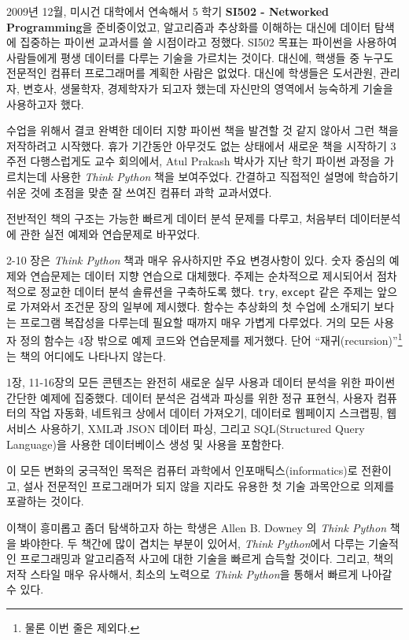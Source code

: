 2009년 12월, 미시건 대학에서 연속해서 5 학기 {\bf SI502 - Networked Programming}을 준비중이었고,
알고리즘과 추상화를 이해하는 대신에 데이터 탐색에 집중하는 파이썬 교과서를 쓸 시점이라고 정했다.
SI502 목표는 파이썬을 사용하여 사람들에게 평생 데이터를 다루는 기술을 가르치는 것이다.
대신에, 핵생들 중 누구도 전문적인 컴퓨터 프로그래머를 계획한 사람은 없었다.
대신에 학생들은 도서관원, 관리자, 변호사, 생물학자, 경제학자가 되고자 했는데 자신만의 영역에서 능숙하게 기술을 사용하고자 했다.

수업을 위해서 결코 완벽한 데이터 지향 파이썬 책을 발견할 것 같지 않아서 그런 책을 저작하려고 시작했다.
휴가 기간동안 아무것도 없는 상태에서 새로운 책을 시작하기 3주전 다행스럽게도 교수 회의에서, Atul Prakash 박사가
지난 학기 파이썬 과정을 가르치는데 사용한 \emph{Think Python} 책을 보여주었다.
간결하고 직접적인 설명에 학습하기 쉬운 것에 초점을 맞춘 잘 쓰여진 컴퓨터 과학 교과서였다.

전반적인 책의 구조는 가능한 빠르게 데이터 분석 문제를 다루고, 처음부터 데이터분석에 관한 실전 예제와 연습문제로 바꾸었다.

2-10 장은 \emph{Think Python} 책과 매우 유사하지만 주요 변경사항이 있다.
숫자 중심의 예제와 연습문제는 데이터 지향 연습으로 대체했다.
주제는 순차적으로 제시되어서 점차적으로 정교한 데이터 분석 솔류션을 구축하도록 했다.
{\tt try}, {\tt except} 같은 주제는 앞으로 가져와서 조건문 장의 일부에 제시했다.
함수는 추상화의 첫 수업에 소개되기 보다는 프로그램 복잡성을 다루는데 필요할 때까지 매우 가볍게 다루었다.
거의 모든 사용자 정의 함수는 4장 밖으로 예제 코드와 연습문제를 제거했다.
단어 ``재귀(recursion)''\footnote{물론 이번 줄은 제외다.}는 책의 어디에도 나타나지 않는다.

1장, 11-16장의 모든 콘텐츠는 완전히 새로운 실무 사용과 데이터 분석을 위한 파이썬 간단한 예제에 집중했다.
데이터 분석은 검색과 파싱를 위한 정규 표현식, 사용자 컴퓨터의 작업 자동화, 네트워크 상에서 데이터 가져오기,
데이터로 웹페이지 스크랩핑, 웹서비스 사용하기, XML과 JSON 데이터 파싱, 그리고 SQL(Structured Query Language)을 사용한
데이터베이스 생성 및 사용을 포함한다.

이 모든 변화의 궁극적인 목적은 컴퓨터 과학에서 인포매틱스(informatics)로 전환이고, 설사 전문적인 프로그래머가 되지 않을 지라도
유용한 첫 기술 과목안으로 의제를 포괄하는 것이다.

이책이 흥미롭고 좀더 탐색하고자 하는 학생은 Allen B. Downey 의 \emph{Think Python} 책을 봐야한다.
두 책간에 많이 겹치는 부분이 있어서, \emph{Think Python}에서 다루는 기술적인 프로그래밍과 알고리즘적 사고에 대한 기술을 빠르게 습득할 것이다.
그리고, 책의 저작 스타일 매우 유사해서, 최소의 노력으로 \emph{Think Python}을 통해서 빠르게 나아갈 수 있다.


